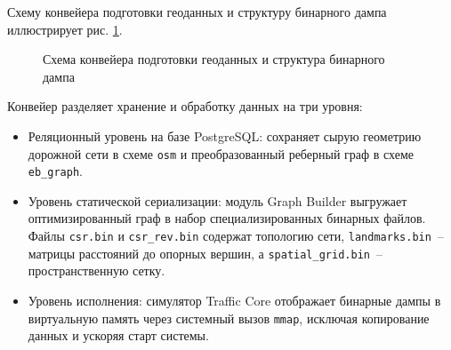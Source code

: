 Схему конвейера подготовки геоданных и структуру бинарного дампа иллюстрирует рис. \ref{fig:binary_dump}.

\begin{figure}[htbp]
    \centering
    
    \caption{Схема конвейера подготовки геоданных и структура бинарного дампа}
    \label{fig:binary_dump}
\end{figure}

Конвейер разделяет хранение и обработку данных на три уровня:
\begin{itemize}
    \item Реляционный уровень на базе PostgreSQL: сохраняет сырую геометрию дорожной сети в схеме \texttt{osm} и преобразованный реберный граф в схеме \texttt{eb\_graph}.
    \item Уровень статической сериализации: модуль Graph Builder выгружает оптимизированный граф в набор специализированных бинарных файлов. Файлы \texttt{csr.bin} и \texttt{csr\_rev.bin} содержат топологию сети, \texttt{landmarks.bin}~-- матрицы расстояний до опорных вершин, а \texttt{spatial\_grid.bin}~-- пространственную сетку.
    \item Уровень исполнения: симулятор Traffic Core отображает бинарные дампы в виртуальную память через системный вызов \texttt{mmap}, исключая копирование данных и ускоряя старт системы.
\end{itemize}
